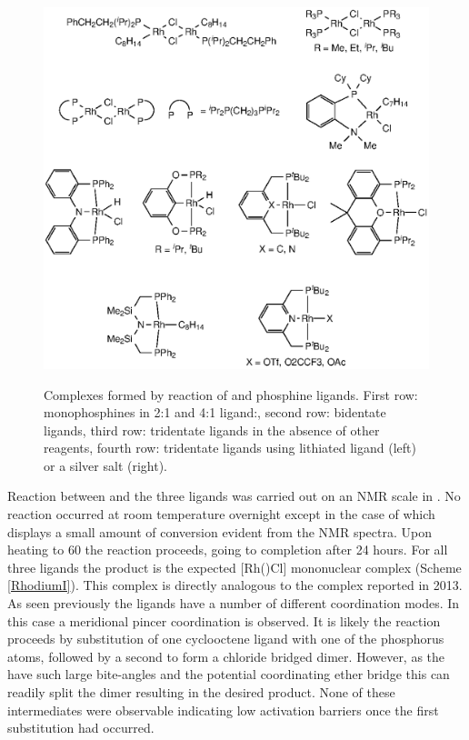 \begin{figure}[h!]
\begin{center}
\vspace{0.5cm}
\includegraphics{../Figures/RhCOEClcomplexes.eps}
\caption[Complexes formed by reaction of  and phosphine ligands]{Complexes formed by reaction of  and phosphine ligands.  First row: monophosphines in 2:1 and 4:1 ligand:, second row: bidentate ligands, third row: tridentate ligands in the absence of other reagents, fourth row: tridentate ligands using lithiated ligand (left) or a silver salt (right).}
\vspace{0.2cm}
\label{RhCOEClcomplexes}
\end{center}
\end{figure}
\vspace{0.2cm}

Reaction between  and the three \tBuxantphos{} ligands was carried out on an NMR scale in .  No reaction occurred at room temperature overnight except in the case of \tBuxantphos{} which displays a small amount of conversion evident from the NMR spectra.  Upon heating to 60 \degC{} the reaction proceeds, going to completion after 24 hours.  For all three \tBuxantphos{} ligands the product is the expected [Rh(\tBuxantphosk)Cl] mononuclear complex (Scheme \ref{RhodiumI}).  This complex is directly analogous to the \iPrxantphos{} complex reported in 2013\cite{Esteruelas2013}.  As seen previously the \tBuxantphos{} ligands have a number of different coordination modes.  In this case a meridional \POP{} pincer coordination is observed.  It is likely the reaction proceeds by substitution of one cyclooctene ligand with one of the phosphorus atoms, followed by a second to form a chloride bridged dimer.  However, as the \tBuxantphos{} have such large bite-angles and the potential coordinating ether bridge this can readily split the dimer resulting in the desired product.  None of these intermediates were observable indicating low activation barriers once the first substitution had occurred.  

